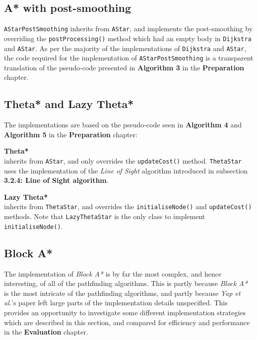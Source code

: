 \documentclass[12pt,notitlepage]{report}
\begin{document}
\subsection{A* with post-smoothing}

{\tt AStarPostSmoothing} inherits from {\tt AStar}, and implements the post-smoothing by overriding the {\tt postProcessing()} method which had an empty body in {\tt Dijkstra} and {\tt AStar}. As per the majority of the implementations of {\tt Dijkstra} and {\tt AStar}, the code required for the implementation of {\tt AStarPostSmoothing} is a transparent translation of the pseudo-code presented in {\bfseries Algorithm 3} in the {\bfseries Preparation} chapter.\\

\subsection {Theta* and Lazy Theta*}

The implementations are based on the pseudo-code seen in {\bfseries Algorithm 4} and {\bfseries Algorithm 5} in the {\bfseries Preparation} chapter: 
\begin{description}
\item{\bfseries Theta*}\\ \hfill inherits from {\tt AStar}, and only overrides the {\tt updateCost()} method. {\tt ThetaStar} uses the implementation of the {\em Line of Sight} algorithm introduced in subsection {\bfseries 3.2.4: Line of Sight algorithm}.
\item {\bfseries Lazy Theta*}\\ \hfill inherits from {\tt ThetaStar}, and overrides the {\tt initialiseNode()} and {\tt updateCost()} methods. Note that {\tt LazyThetaStar} is the only class to implement {\tt initialiseNode()}.
\end{description}

\subsection {Block A*}
The implementation of {\em Block A*} is by far the most complex, and hence interesting, of all of the pathfinding algorithms. This is partly because {\em Block A*} is the most intricate of the pathfinding algorithms, and partly because {\em Yap et al.}'s paper left large parts of the implementation details unspecified. This provides an opportunity to investigate some different implementation strategies which are described in this section, and compared for efficiency and performance in the {\bfseries Evaluation} chapter.\\
\end{document}
